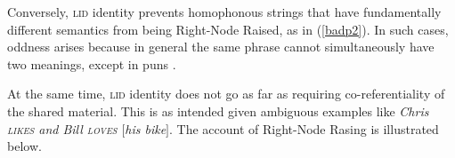 \documentclass[output=paper]{langsci/langscibook}
\begin{document}
\noindent
Conversely, \textsc{lid} identity prevents homophonous strings that have fundamentally different semantics from being Right-Node Raised, as in (\ref{badp2}). In such cases,  oddness arises because in general the same phrase cannot simultaneously have  two meanings, except in puns  \citep[316]{zaenenkart}. 

\begin{exe}
\ex \begin{xlista} 
\end{xlista}\label{badp2}
\end{exe}

\noindent
At the same time, \textsc{lid} identity does
not go as far as requiring co-referentiality of the shared material. This is  as intended
given ambiguous examples like
{\it Chris \textsc{likes} and Bill \textsc{loves}  $[$his bike$]$}.
The account of Right-Node Rasing is illustrated below.
\end{document}

